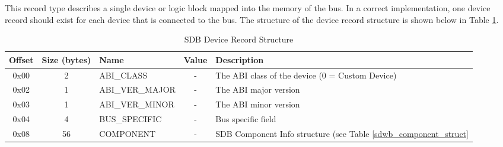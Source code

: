 \documentclass[a4paper, 12pt]{article}
\begin{document}
This record type describes a single device or logic block mapped into the memory of the
bus. In a correct implementation, one device record should exist for each device that is
connected to the bus. The structure of the device record structure is shown below in Table
\ref{sdwb_dev_struct}.

\begin{center}
  \begin{savenotes}
    \begin{table}[!ht]\footnotesize
      \caption{SDB Device Record Structure}\label{sdwb_dev_struct}\centering
        \begin{tabular}{| c | c | l | c | p{5cm} |} \hline
        Offset & Size (bytes) & Name & Value & Description \\ \hline
        0x00 & 2 & ABI\_CLASS & - & The ABI class of the device (0 = Custom Device) \\ \hline
        0x02 & 1 & ABI\_VER\_MAJOR & - & The ABI major version \\ \hline
        0x03 & 1 & ABI\_VER\_MINOR & - & The ABI minor version \\ \hline
        0x04 & 4 & BUS\_SPECIFIC & - & Bus specific field \\ \hline
        0x08 & 56 & COMPONENT & - & SDB Component Info structure (see Table \ref{sdwb_component_struct} \\ \hline
        \end{tabular}
    \end{table}
  \end{savenotes}
\end{center}
\end{document}
